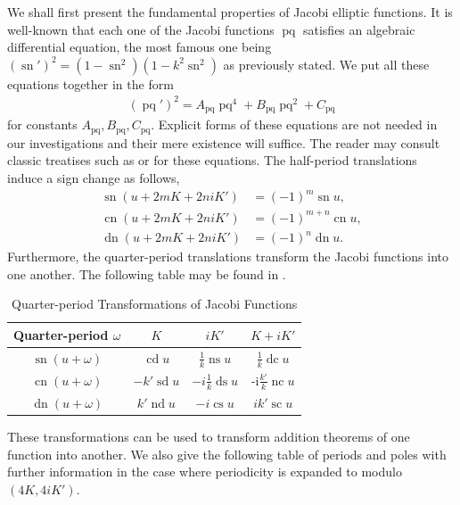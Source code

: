 \documentclass[10pt,a4paper]{amsart}
\DeclareMathOperator{\ns}{ns}
\DeclareMathOperator{\nc}{nc}
\DeclareMathOperator{\dn}{dn}
\DeclareMathOperator{\ds}{ds}
\DeclareMathOperator{\cs}{cs}
\DeclareMathOperator{\sn}{sn}
\DeclareMathOperator{\cn}{cn}
\DeclareMathOperator{\nd}{nd}
\DeclareMathOperator{\scJ}{sc}
\DeclareMathOperator{\cd}{cd}
\DeclareMathOperator{\dc}{dc}
\DeclareMathOperator{\sd}{sd}
\DeclareMathOperator{\pq}{pq}
\begin{document}
We shall first present the fundamental properties of Jacobi elliptic functions. It is well-known that each one of the Jacobi functions $\pq$ satisfies an algebraic differential equation, the most famous one being $\left(\sn'\right)^2=\left(1-\sn^2\right)\left(1-k^2\sn^2\right)$ as previously stated. We put all these equations together in the form
\begin{align*}
    \left(\pq'\right)^2=A_{\pq}\pq^4+B_{\pq}\pq^2+C_{\pq}
\end{align*}
for constants $A_{\pq},B_{\pq},C_{\pq}$. Explicit forms of these equations are not needed in our investigations and their mere existence will suffice. The reader may consult classic treatises such as \cite{Whittakter} or \cite{dlmf} for these equations. The half-period translations induce a sign change as follows,
\begin{align*}
    \sn(u+2mK+2niK')&=(-1)^{m}\sn u,\\
    \cn(u+2mK+2niK')&=(-1)^{m+n}\cn u,\\
    \dn(u+2mK+2niK')&=(-1)^{n}\dn u.
\end{align*}
Furthermore, the quarter-period translations transform the Jacobi functions into one another. The following table may be found in \cite{dlmf}.
\begin{center}
\begin{table}[h]
    \begin{tabular}{|c|c|c|c|}
    \hline
    Quarter-period $\omega$ & $K$ & $iK'$ & $K+iK'$\\ \hline
    $\sn(u+\omega)$ & $\cd u$ & $\frac{1}{k}\ns u$ & $\frac{1}{k}\dc u$ \\ \hline
    $\cn(u+\omega)$ & $-k' \sd u$ & $-i\frac{1}{k}\ds u$ & -i$\frac{k'}{k}\nc u$ \\ \hline      
    $\dn(u+\omega)$ & $k'\nd  u$ & $-i\cs u$ & $i k'\scJ u$ \\ \hline      
    \end{tabular}\medskip
    
    \caption{Quarter-period Transformations of Jacobi Functions}
\end{table}
\end{center}
These transformations can be used to transform addition theorems of one function into another. We also give the following table of periods and poles with further information in the case where periodicity is expanded to modulo $(4K,4iK')$.
\end{document}
